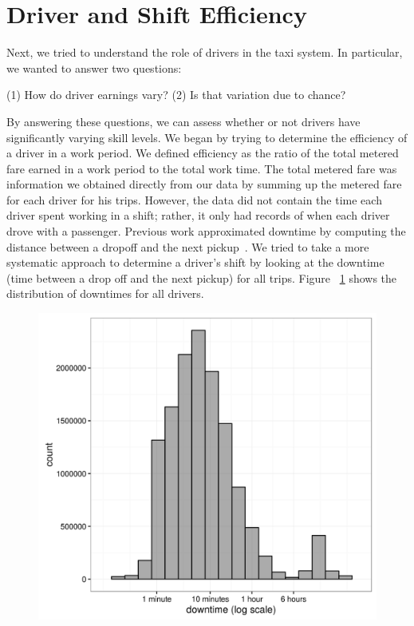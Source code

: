 \documentclass[twocolumn]{article}
\begin{document}
\section{Driver and Shift Efficiency}
Next, we tried to understand the role of drivers in the taxi system. In particular, we wanted to answer two questions:

(1) How do driver earnings vary?
(2) Is that variation due to chance?

By answering these questions, we can assess whether or not drivers have significantly varying skill levels. We began by trying to determine the efficiency of a driver in a work period. We defined efficiency as the ratio of the total metered fare earned in a work period to the total work time. The total metered fare was information we obtained directly from our data by summing up the metered fare for each driver for his trips. However, the data did not contain the time each driver spent working in a shift; rather, it only had records of when each driver drove with a passenger. Previous work approximated downtime by computing the distance between a dropoff and the next pickup~\cite{LEE:2015}. We tried to take a more systematic approach to determine a driver's shift by looking at the downtime (time between a drop off and the next pickup) for all trips. Figure ~\ref{fig:downtime_distribution} shows the distribution of downtimes for all drivers. 

\begin{figure}[h]
  \centering
  \includegraphics[width=.9\linewidth]{downtime_distribution}
  \label{fig:downtime_distribution}
\end{figure}
\end{document}
